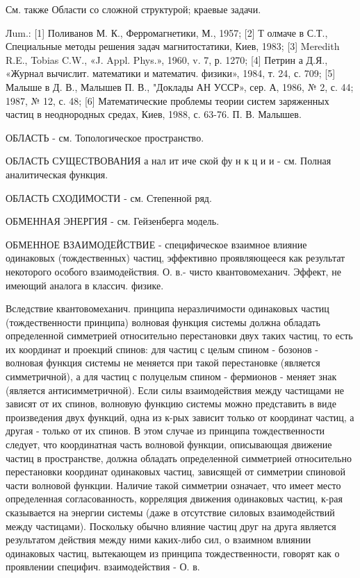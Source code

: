 \documentclass[10pt]{article}
\begin{document}
См. также Области со сложной структурой; краевые задачи.



Лum.: [1] Поливанов М. К., Ферромагнетики, М., 1957; [2] Т олмаче в С.Т., Специальные методы решения задач магнитостатики, Киев, 1983; [3] Meredith R.E., Tobias C.W., «J. Appl. Phys.», 1960, v. 7, р. 1270; [4] Петрин а Д.Я., «Журнал вычислит. математики и математич. физики», 1984, т. 24, с. 709; [5] Малыше в Д. В., Малышев П. В., "Доклады АН УССР», сер. А, 1986, № 2, с. 44; 1987, № 12, с. 48; [6] Математические проблемы теории систем заряженных частиц в неоднородных средах, Киев, 1988, с. 63-76. П. В. Малышев.



ОБЛАСТЬ - см. Топологическое пространство.



ОБЛАСТЬ СУЩЕСТВОВАНИЯ а нал ит иче ской фу н к ц и и - см. Полная аналитическая функция.



ОБЛАСТЬ СХОДИМОСТИ - см. Степенной ряд.



ОБМЕННАЯ ЭНЕРГИЯ - см. Гейзенберга модель.



ОБМЕННОЕ ВЗАИМОДЕЙСТВИЕ - специфическое взаимное влияние одинаковых (тождественных) частиц, эффективно проявляющееся как результат некоторого особого взаимодействия. О. в.- чисто квантовомеханич. Эффект, не имеющий аналога в классич. физике.



Вследствие квантовомеханич. принципа неразличимости одинаковых частиц (тождественности принципа) волновая функция системы должна обладать определенной симметрией относительно перестановки двух таких частиц, то есть их координат и проекций спинов: для частиц с целым спином - бозонов - волновая функция системы не меняется при такой перестановке (является симметричной), а для частиц с полуцелым спином - фермионов - меняет знак (является антисимметричной). Если силы взаимодействия между частищами не зависят от их спинов, волновую функцию системы можно представить в виде произведения двух функций, одна из к-рых зависит только от координат частиц, а другая - только от их спинов. В этом случае из принципа тождественности следует, что координатная часть волновой функции, описывающая движение частиц в пространстве, должна обладать определенной симметрией относительно перестановки координат одинаковых частиц, зависящей от симметрии спиновой части волновой функции. Наличие такой симметрии означает, что имеет место определенная согласованность, корреляция движения одинаковых частиц, к-рая сказывается на энергии системы (даже в отсутствие силовых взаимодействий между частицами). Поскольку обычно влияние частиц друг на друга является результатом действия между ними каких-либо сил, о взаимном влиянии одинаковых частиц, вытекающем из принципа тождественности, говорят как о проявлении специфич. взаимодействия - О. в.
\end{document}

